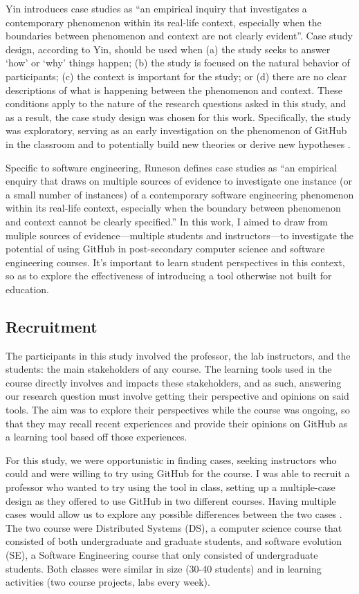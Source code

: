 Yin \cite{yin2013case} introduces case studies as ``an empirical inquiry that investigates a contemporary phenomenon within its real-life context, especially when the boundaries between phenomenon and context are not clearly evident''. Case study design, according to Yin, should be used when (a) the study seeks to answer `how' or `why' things happen; (b) the study is focused on the natural behavior of participants; (c) the context is important for the study; or (d) there are no clear descriptions of what is happening between the phenomenon and context. These conditions apply to the nature of the research questions asked in this study, and as a result, the case study design was chosen for this work. Specifically, the study was exploratory, serving as an early investigation on the phenomenon of GitHub in the classroom and to potentially build new theories or derive new hypotheses \cite{easterbrook2008selecting}.

Specific to software engineering, Runeson \cite{runeson2012case} defines case studies as ``an empirical enquiry that draws on multiple sources of evidence to investigate one instance (or a small number of instances) of a contemporary software engineering phenomenon within its real-life context, especially when the boundary between phenomenon and context cannot be clearly specified.'' In this work, I aimed to draw from muliple sources of evidence---multiple students and instructors---to investigate the potential of using GitHub in post-secondary computer science and software engineering courses. It's important to learn student perspectives in this context, so as to explore the effectiveness of introducing a tool otherwise not built for education.

\subsection{Recruitment}
The participants in this study involved the professor, the lab instructors, and the students: the main stakeholders of any course. The learning tools used in the course directly involves and impacts these stakeholders, and as such, answering our research question must involve getting their perspective and opinions on said tools. The aim was to explore their perspectives while the course was ongoing, so that they may recall recent experiences and provide their opinions on GitHub as a learning tool based off those experiences.

For this study, we were opportunistic in finding cases, seeking instructors who could and were willing to try using GitHub for the course. I was able to recruit a professor who wanted to try using the tool in class, setting up a multiple-case design as they offered to use GitHub in two different courses. Having multiple cases would allow us to explore any possible differences between the two cases \cite{yin2013case}. The two course were Distributed Systems (DS), a computer science course that consisted of both undergraduate and graduate students, and software evolution (SE), a Software Engineering course that only consisted of undergraduate students. Both classes were similar in size (30-40 students) and in learning activities (two course projects, labs every week).

